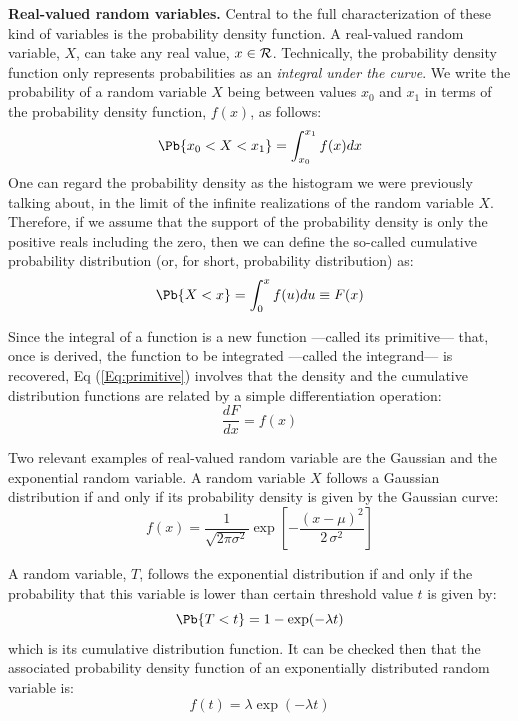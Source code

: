 {\bf Real-valued random variables.} Central to the full characterization of these kind of variables is the probability density function. A real-valued random variable, $X$, can take any real value, $x \in \cal{R}$. Technically, the probability density function only represents probabilities as an {\it integral under the curve}. We write the probability of a random variable $X$ being between values $x_0$ and $x_1$ in terms of the probability density function, $f(x)$, as follows:
\begin{equation}
    \Pb\{ x_0 < X < x_1 \} = \int_{x_0}^{x_1} f(x)dx
\end{equation}
One can regard the probability density as the histogram we were previously talking about, in the limit of the infinite realizations of the random variable $X$. Therefore, if we assume that the support of the probability density is only the positive reals including the zero, then we can define the so-called cumulative probability distribution (or, for short, probability distribution) as:
\begin{equation}
    \Pb\{ X < x \} = \int_{0}^{x} f(u)du \equiv F(x)
    \label{Eq:primitive}
\end{equation}

Since the integral of a function is a new function ---called its primitive--- that, once is derived, the function to be integrated ---called the integrand--- is recovered, Eq (\ref{Eq:primitive}) involves that the density and the cumulative distribution functions are related by a simple differentiation operation:
\begin{equation}
    \frac{dF}{dx} = f(x)
\end{equation} 
\smallskip

Two relevant examples of real-valued random variable are the Gaussian and the exponential random variable. A random variable $X$ follows a Gaussian distribution if and only if its probability density is given by the Gaussian curve:
\begin{equation}
    f(x) = \frac{1}{\sqrt{2\pi\sigma^2}}\exp\left[-\frac{(x-\mu)^2}{2\,\sigma^2}\right] 
\end{equation}
\small

A random variable, $T$, follows the exponential distribution if and only if the probability that this variable is lower than certain threshold value $t$ is given by: 
\begin{equation}
    \Pb\{ T < t \} = 1 - \exp (-\lambda t)
    \label{Exponential_Distribution}
\end{equation}
which is its cumulative distribution function. It can be checked then that the associated probability density function of an exponentially distributed random variable is: 
\begin{equation}
    f(t) = \lambda \exp (-\lambda t)
\end{equation}

